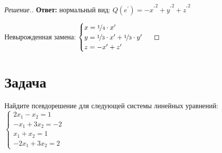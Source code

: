 \documentclass[a4paper]{article}
\theoremstyle{remark}
\newcommand{\eq}[1]{\begin{cases} #1 \end{cases}}
\begin{document}
\begin{proof}[Решение.]
            \textbf{Ответ:} нормальный вид: $Q(e^\prime) = -{x^\prime}^2 + {y^\prime}^2 + {z^\prime}^2$

            Невырожденная замена: 
            $\eq{
                x = \nicefrac14 \cdot x^\prime \\
                y = \nicefrac13 \cdot x^\prime + \nicefrac13 \cdot y^\prime \\
                z = -x^\prime + z^\prime
            }
            $

        \end{proof}

    \section*{Задача }
        Найдите псевдорешение для следующей системы линейных уравнений: 
        $\eq{
            2x_1 - x_2 = 1\\
            -x_1 + 3x_2 = -2 \\
            x_1 + x_2 = 1 \\
            -2x_1 + 3x_2 = 2
        }$
\end{document}
